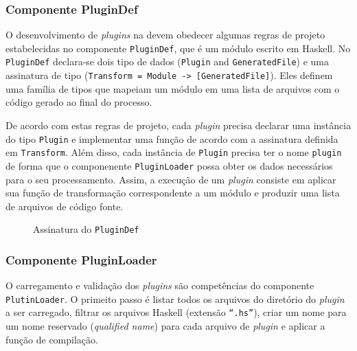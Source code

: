 \subsubsection{Componente PluginDef}{\label{sec:plugindef}}

O desenvolvimento de \textit{plugins} na \neoidl{} devem obedecer algumas regras
de projeto estabelecidas no componente \texttt{PluginDef}, que é um módulo
escrito em Haskell. No \texttt{PluginDef} declara-se dois tipo de dados
(\texttt{Plugin} and \texttt{GeneratedFile}) e uma assinatura de tipo
(\texttt{Transform = Module -> [GeneratedFile]}). Eles definem uma família de
tipos que mapeiam um módulo \neoidl{} em uma lista de arquivos com o código
gerado ao final do processo.

De acordo com estas regras de projeto, cada \textit{plugin} precisa declarar uma
instância do tipo \texttt{Plugin} e implementar uma função de acordo com a
assinatura definida em \texttt{Transform}. Além disso, cada instância de  
\texttt{Plugin} precisa ter o nome \texttt{plugin} de forma que o componenente
\texttt{PluginLoader} possa obter os dados necessários para o seu processamento.
Assim, a execução de um \textit{plugin} consiste em aplicar sua função de
transformação correspondente a um módulo \neoidl{} e produzir uma lista de
arquivos de código fonte. 

\vspace{6mm}

\begin{figure}[h]
\begin{small}

\vspace{-.5cm}
\end{small}
\caption{Assinatura do \texttt{PluginDef}}
\label{lst:pluginDef}
\end{figure}

\subsubsection{Componente PluginLoader}

O carregamento e validação dos \textit{plugins} são competências do componente
\texttt{PlutinLoader}. O primeito passo é listar todos os arquivos do diretório
do \textit{plugin} a ser carregado, filtrar os arquivos Haskell (extensão
\texttt{``.hs''}), criar um nome para um nome reservado (\textit{qualified
name}) para cada arquivo de \textit{plugin} e aplicar a função de compilação.

